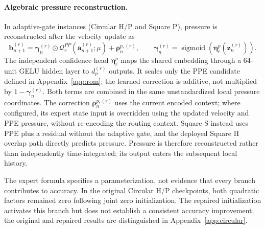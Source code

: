 \paragraph{Algebraic pressure reconstruction.}
In adaptive-gate instances (Circular H/P and Square P), pressure is
reconstructed after the velocity update as
\begin{equation}
  \bm b_{n+1}^{(r)}
  =\bm\gamma_n^{(r)}\odot
     \mathcal Q_r^{PP}(\bm a_{n+1}^{(r)};\mu)
   +\bm\rho_n^{p,(r)},
  \qquad
  \bm\gamma_n^{(r)}
  =\operatorname{sigmoid}(\bm\eta_r^p(\bm z_n^{(r)})).
  \label{eq:main_pressure_closure}
\end{equation}
The independent confidence head $\bm\eta_r^p$ maps the shared
embedding through a 64-unit GELU hidden layer to $d_p^{(r)}$ outputs.
It scales only the PPE candidate defined in Appendix~\ref{app:rom};
the learned correction is additive, not multiplied by
$1-\bm\gamma_n^{(r)}$. Both terms are combined in the same
unstandardized local pressure coordinates. The correction
$\bm\rho_n^{p,(r)}$ uses the current encoded context; where configured,
its expert state input is overridden using the updated velocity and
PPE pressure, without re-encoding the routing context.
Square S instead uses PPE plus a residual without the adaptive gate,
and the deployed Square H overlap path directly predicts pressure.
Pressure is therefore reconstructed rather than independently
time-integrated; its output enters the subsequent local history.

The expert formula specifies a parameterization, not evidence that
every branch contributes to accuracy. In the original Circular H/P
checkpoints, both quadratic factors remained zero following joint
zero initialization. The repaired initialization activates this
branch but does not establish a consistent accuracy improvement;
the original and repaired results are distinguished in
Appendix~\ref{app:circular}.
